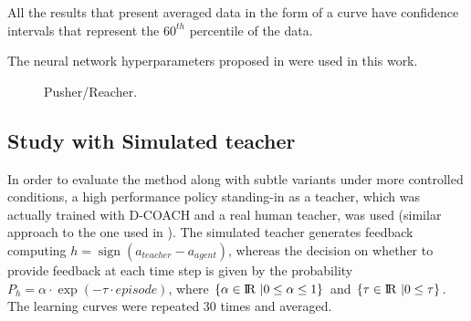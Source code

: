 All the results that present averaged data in the form of a curve have confidence intervals that represent the $60^{th}$ percentile of the data.

The neural network hyperparameters proposed in \cite{perez2018interactive} were used in this work.  

\begin{figure}[t]
\centering
{} 
\hspace{0.25cm}
\hspace{0.25cm}
\hspace{0.25cm}
\caption{Pusher/Reacher.} 
\label{fig:PusherReacher} 
\end{figure}


\subsection{Study with Simulated teacher}
In order to evaluate the method along with subtle variants under more controlled conditions, a high performance policy standing-in as a teacher, which was actually trained with D-COACH and a real human teacher, was used (similar approach to the one used in  \cite{Celemin2018AnInteractive}). The simulated teacher generates feedback computing $h = \operatorname{sign}(a_{teacher} - a_{agent})$, whereas the decision on whether to provide feedback at each time step is given by the probability $P_{h} = \alpha \cdot\exp(-\tau\cdot episode)$, where $\{\alpha \in {\rm I\!R}\ | 0 \le \alpha \le 1\}$ and $\{\tau \in {\rm I\!R}\ | 0 \le \tau\}$. The learning curves were repeated 30 times and averaged.

